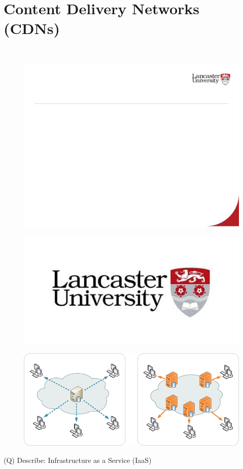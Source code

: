 \documentclass[12pt]{article}
\begin{document}
\section{Content Delivery Networks (CDNs)}
\\
\begin{figure}[H]
\includegraphics[width=0.5\linewidth]{page85-image-1.png}
\end{figure}
\begin{figure}[H]
\includegraphics[width=0.5\linewidth]{page85-image-2.png}
\end{figure}
\begin{figure}[H]
\includegraphics[width=0.5\linewidth]{page85-image-3.png}
\end{figure}
\clearpage
(Q)
Describe: Infrastructure as a Service (IaaS)
\clearpage
\end{document}
